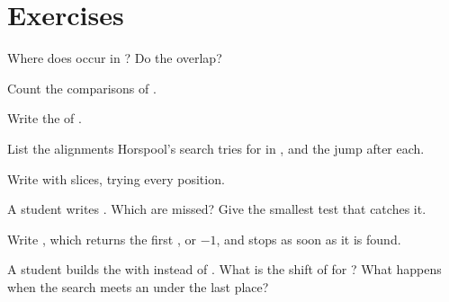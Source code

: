\section{Exercises}\label{sec:g12:text-search:exercises}

\begin{exercise}[$\star$]\label{exo:g12:text-search:1}
Where does  occur in ? Do the  overlap?
\end{exercise}

\begin{exercise}[$\star$]\label{exo:g12:text-search:2}
Count the comparisons of .
\end{exercise}

\begin{exercise}[$\star$]\label{exo:g12:text-search:3}
Write the  of .
\end{exercise}

\begin{exercise}[$\star$]\label{exo:g12:text-search:4}
List the alignments Horspool's search tries for  in , and the jump after each.
\end{exercise}

\begin{exercise}[$\star$]\label{exo:g12:text-search:5}
Write  with slices, trying every position.
\end{exercise}

\begin{exercise}[$\star\star$]\label{exo:g12:text-search:6}
A student writes . Which  are missed? Give the smallest test that
catches it.
\end{exercise}

\begin{exercise}[$\star\star$]\label{exo:g12:text-search:7}
Write , which returns the first , or $-1$, and stops as soon as it is found.
\end{exercise}

\begin{exercise}[$\star\star$]\label{exo:g12:text-search:8}
A student builds the  with  instead of . What is the shift of 
for ? What happens when the search meets an  under the last place?
\end{exercise}

